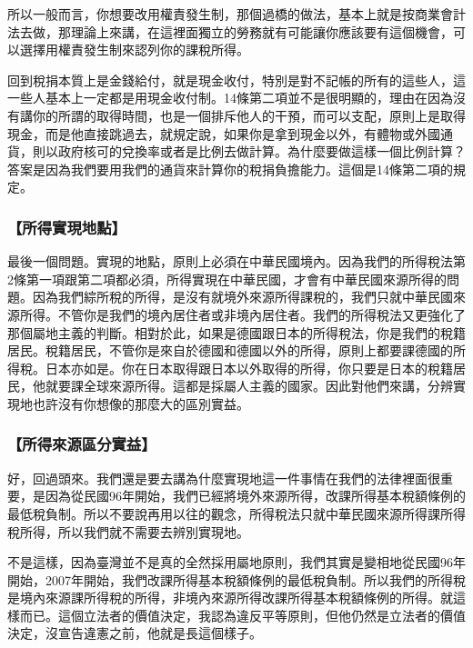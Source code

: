\documentclass[oneside,sub3section]{ctexbook}
\begin{document}
所以一般而言，你想要改用權責發生制，那個過橋的做法，基本上就是按商業會計法去做，那理論上來講，在這裡面獨立的勞務就有可能讓你應該要有這個機會，可以選擇用權責發生制來認列你的課稅所得。

回到稅捐本質上是金錢給付，就是現金收付，特別是對不記帳的所有的這些人，這一些人基本上一定都是用現金收付制。14條第二項並不是很明顯的，理由在因為沒有講你的所謂的取得時間，也是一個排斥他人的干預，而可以支配，原則上是取得現金，而是他直接跳過去，就規定說，如果你是拿到現金以外，有體物或外國通貨，則以政府核可的兌換率或者是比例去做計算。為什麼要做這樣一個比例計算？答案是因為我們要用我們的通貨來計算你的稅捐負擔能力。這個是14條第二項的規定。

\hypertarget{ux6240ux5f97ux5be6ux73feux5730ux9ede}{%
\subsubsection{【所得實現地點】}\label{ux6240ux5f97ux5be6ux73feux5730ux9ede}}

最後一個問題。實現的地點，原則上必須在中華民國境內。因為我們的所得稅法第2條第一項跟第二項都必須，所得實現在中華民國，才會有中華民國來源所得的問題。因為我們綜所稅的所得，是沒有就境外來源所得課稅的，我們只就中華民國來源所得。不管你是我們的境內居住者或非境內居住者。我們的所得稅法又更強化了那個屬地主義的判斷。相對於此，如果是德國跟日本的所得稅法，你是我們的稅籍居民。稅籍居民，不管你是來自於德國和德國以外的所得，原則上都要課德國的所得稅。日本亦如是。你在日本取得跟日本以外取得的所得，你只要是日本的稅籍居民，他就要課全球來源所得。這都是採屬人主義的國家。因此對他們來講，分辨實現地也許沒有你想像的那麼大的區別實益。

\hypertarget{ux6240ux5f97ux4f86ux6e90ux5340ux5206ux5be6ux76ca}{%
\subsubsection{【所得來源區分實益】}\label{ux6240ux5f97ux4f86ux6e90ux5340ux5206ux5be6ux76ca}}

好，回過頭來。我們還是要去講為什麼實現地這一件事情在我們的法律裡面很重要，是因為從民國96年開始，我們已經將境外來源所得，改課所得基本稅額條例的最低稅負制。所以不要說再用以往的觀念，所得稅法只就中華民國來源所得課所得稅所得，所以我們就不需要去辨別實現地。

不是這樣，因為臺灣並不是真的全然採用屬地原則，我們其實是變相地從民國96年開始，2007年開始，我們改課所得基本稅額條例的最低稅負制。所以我們的所得稅是境內來源課所得稅的所得，非境內來源所得改課所得基本稅額條例的所得。就這樣而已。這個立法者的價值決定，我認為違反平等原則，但他仍然是立法者的價值決定，沒宣告違憲之前，他就是長這個樣子。
\end{document}
